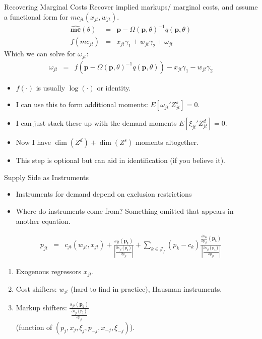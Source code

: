 \documentclass[xcolor=pdftex,dvipsnames,table,mathserif]{beamer}
\begin{document}
\begin{frame}{Recovering Marginal Costs }
Recover implied markups/ marginal costs, and assume a functional form for $mc_{jt}(x_{jt},w_{jt})$.
\begin{eqnarray*}
\widehat{\mathbf{mc}}(\theta)&=& \mathbf{p}- \Omega(\mathbf{p},\theta)^{-1} q(\mathbf{p},\theta)\\
f(mc_{jt}) &=& x_{jt} \gamma_1 + w_{jt} \gamma_2 + \omega_{jt}
\end{eqnarray*}
Which we can solve for $\omega_{jt}$:
\begin{eqnarray*}
\omega_{jt} &=&  f(\mathbf{p}- \Omega(\mathbf{p},\theta)^{-1} q(\mathbf{p},\theta)) - x_{jt} \gamma_1 - w_{jt} \gamma_2
\end{eqnarray*}
\begin{itemize}
\item $f(\cdot)$ is usually $\log(\cdot)$ or identity.
\item I can use this to form additional moments: $E[\omega_{jt}' Z_{jt}^{s}]=0$.
\item I can just stack these up with the demand moments $E[\xi_{jt}' Z_{jt}^d]=0$.
\item Now I have $\dim(Z^d) + \dim(Z^s)$ moments altogether.
\item This step is optional but can aid in identification (if you believe it).
\end{itemize}

\end{frame}

\begin{frame}{Supply Side as Instruments }
\begin{itemize}
\item Instruments for demand depend on \alert{exclusion restrictions}
\item Where do instruments come from? Something omitted that appears in another equation.
\end{itemize}
\begin{eqnarray*}
p_{jt}  &=& c_{jt}(w_{jt},x_{jt}) +  \frac{s_{jt}(\mathbf{p_t})}{\left|\frac{\partial s_{jt}(\mathbf{p_t})}{\partial p_{jt}}\right|}  +\sum_{k \in \mathcal{J}_f} (p_k - c_k) \frac{\frac{ \partial s_{kt}}{\partial p_{jt}}(\mathbf{p_t})}{\left|\frac{\partial s_{jt}(\mathbf{p_t})}{\partial p_{jt}}\right|}  
\end{eqnarray*}
\begin{enumerate}
\item Exogenous regressors $x_{jt}$.
\item Cost shifters: $w_{jt}$ (hard to find in practice), Hausman instruments.
\item Markup shifters:  $ \frac{s_{jt}(\mathbf{p_t})}{\frac{\partial s_{jt}(\mathbf{p_t})}{\partial p_{jt}}}$ \\(function of $(p_j,x_j,\xi_j, p_{-j},x_{-j},\xi_{-j})$).
\end{enumerate}
\end{frame}
\end{document}
